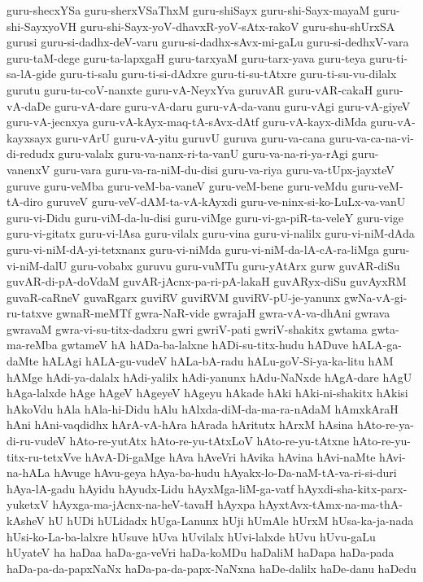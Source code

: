 {guru-shecxYSa
guru-sherxVSaThxM
guru-shiSayx
guru-shi-Sayx-mayaM
guru-shi-SayxyoVH
guru-shi-Sayx-yoV-dhavxR-yoV-sAtx-rakoV
guru-shu-shUrxSA
gurusi
guru-si-dadhx-deV-varu
guru-si-dadhx-sAvx-mi-gaLu
guru-si-dedhxV-vara
guru-taM-dege
guru-ta-lapxgaH
guru-tarxyaM
guru-tarx-yava
guru-teya
guru-ti-sa-lA-gide
guru-ti-salu
guru-ti-si-dAdxre
guru-ti-su-tAtxre
guru-ti-su-vu-dilalx
gurutu
guru-tu-coV-nanxte
guru-vA-NeyxYva
guruvAR
guru-vAR-cakaH
guru-vA-daDe
guru-vA-dare
guru-vA-daru
guru-vA-da-vanu
guru-vAgi
guru-vA-giyeV
guru-vA-jecnxya
guru-vA-kAyx-maq-tA-sAvx-dAtf
guru-vA-kayx-diMda
guru-vA-kayxsayx
guru-vArU
guru-vA-yitu
guruvU
guruva
guru-va-cana
guru-va-ca-na-vi-di-redudx
guru-valalx
guru-va-nanx-ri-ta-vanU
guru-va-na-ri-ya-rAgi
guru-vanenxV
guru-vara
guru-va-ra-niM-du-disi
guru-va-riya
guru-va-tUpx-jayxteV
guruve
guru-veMba
guru-veM-ba-vaneV
guru-veM-bene
guru-veMdu
guru-veM-tA-diro
guruveV
guru-veV-dAM-ta-vA-kAyxdi
guru-ve-ninx-si-ko-LuLx-va-vanU
guru-vi-Didu
guru-viM-da-lu-disi
guru-viMge
guru-vi-ga-piR-ta-veleY
guru-vige
guru-vi-gitatx
guru-vi-lAsa
guru-vilalx
guru-vina
guru-vi-nalilx
guru-vi-niM-dAda
guru-vi-niM-dA-yi-tetxnanx
guru-vi-niMda
guru-vi-niM-da-lA-cA-ra-liMga
guru-vi-niM-dalU
guru-vobabx
guruvu
guru-vuMTu
guru-yAtArx
gurw
guvAR-diSu
guvAR-di-pA-doVdaM
guvAR-jAcnx-pa-ri-pA-lakaH
guvARyx-diSu
guvAyxRM
guvaR-caRneV
guvaRgarx
guviRV
guviRVM
guviRV-pU-je-yanunx
gwNa-vA-gi-ru-tatxve
gwnaR-meMTf
gwra-NaR-vide
gwrajaH
gwra-vA-va-dhAni
gwrava
gwravaM
gwra-vi-su-titx-dadxru
gwri
gwriV-pati
gwriV-shakitx
gwtama
gwta-ma-reMba
gwtameV
hA
hADa-ba-lalxne
hADi-su-titx-hudu
hADuve
hALA-ga-daMte
hALAgi
hALA-gu-vudeV
hALa-bA-radu
hALu-goV-Si-ya-ka-litu
hAM
hAMge
hAdi-ya-dalalx
hAdi-yalilx
hAdi-yanunx
hAdu-NaNxde
hAgA-dare
hAgU
hAga-lalxde
hAge
hAgeV
hAgeyeV
hAgeyu
hAkade
hAki
hAki-ni-shakitx
hAkisi
hAkoVdu
hAla
hAla-hi-Didu
hAlu
hAlxda-diM-da-ma-ra-nAdaM
hAmxkAraH
hAni
hAni-vaqdidhx
hArA-vA-hAra
hArada
hAritutx
hArxM
hAsina
hAto-re-ya-di-ru-vudeV
hAto-re-yutAtx
hAto-re-yu-tAtxLoV
hAto-re-yu-tAtxne
hAto-re-yu-titx-ru-tetxVve
hAvA-Di-gaMge
hAva
hAveVri
hAvika
hAvina
hAvi-naMte
hAvi-na-hALa
hAvuge
hAvu-geya
hAya-ba-hudu
hAyakx-lo-Da-naM-tA-va-ri-si-duri
hAya-lA-gadu
hAyidu
hAyudx-Lidu
hAyxMga-liM-ga-vatf
hAyxdi-sha-kitx-parx-yuketxV
hAyxga-ma-jAcnx-na-heV-tavaH
hAyxpa
hAyxtAvx-tAmx-na-ma-thA-kAsheV
hU
hUDi
hULidadx
hUga-Lanunx
hUji
hUmAle
hUrxM
hUsa-ka-ja-nada
hUsi-ko-La-ba-lalxre
hUsuve
hUva
hUvilalx
hUvi-lalxde
hUvu
hUvu-gaLu
hUyateV
ha
haDaa
haDa-ga-veVri
haDa-koMDu
haDaliM
haDapa
haDa-pada
haDa-pa-da-papxNaNx
haDa-pa-da-papx-NaNxna
haDe-dalilx
haDe-danu
haDedu
}
